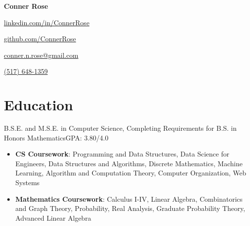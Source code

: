 \documentclass[letterpaper,11pt]{article}
\begin{document}
\begin{center}
    \Huge{\textbf{Conner Rose}} \\
    \begin{itemize*}
        \item[] \href{https://linkedin.com/in/ConnerRose}{linkedin.com/in/ConnerRose}
        \item \href{https://github.com/ConnerRose}{github.com/ConnerRose}
        \item \href{mailto:conner.n.rose@gmail.com}{conner.n.rose@gmail.com}
        \item \href{tel:+15176481359}{(517) 648-1359}
    \end{itemize*}
\end{center}

\section{Education}
{B.S.E. and M.S.E. in Computer Science, Completing Requirements for B.S. in
    Honors Mathematics}{GPA: 3.80/4.0}
\begin{itemize}
    \item \textbf{CS Coursework}: Programming and Data Structures, Data Science
          for Engineers, Data Structures and Algorithms, Discrete Mathematics,
          Machine Learning, Algorithm and Computation Theory, Computer
          Organization, Web Systems
    \item \textbf{Mathematics Coursework}: Calculus I-IV, Linear Algebra,
          Combinatorics and Graph Theory, Probability, Real Analysis, Graduate
          Probability Theory, Advanced Linear Algebra
\end{itemize}
\end{document}

